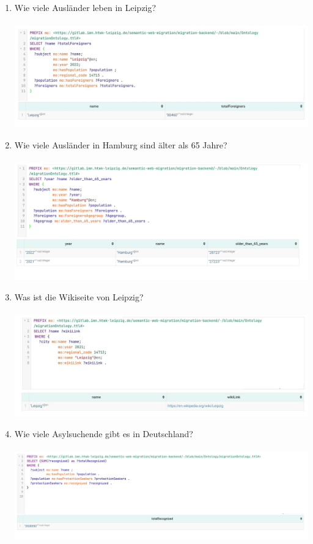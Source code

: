 \documentclass[a4paper, 12pt]{article}
\begin{document}
\begin{enumerate}
    \item Wie viele Ausländer leben in Leipzig? \\ \\
    \includegraphics[width=1\textwidth]{Frage1.jpg} \\
    \item Wie viele Ausländer in Hamburg sind älter als 65 Jahre? \\ \\
    \includegraphics[width=1\textwidth]{Frage2.jpg} \\
    \item Was ist die Wikiseite von Leipzig? \\ \\
    \includegraphics[width=1\textwidth]{Frage3.jpg} \\
    \item Wie viele Asylsuchende gibt es in Deutschland? \\ \\
    \includegraphics[width=1\textwidth]{Frage4.jpg} \\

\end{enumerate}
\end{document}
